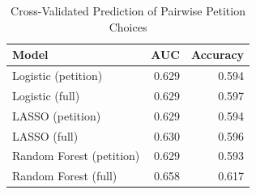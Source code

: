 \begin{table}[ht]
\centering
\begin{tabular}{lrr}
  \toprule
Model & AUC & Accuracy \\ 
  \midrule
Logistic (petition) & 0.629 & 0.594 \\ 
  Logistic (full) & 0.629 & 0.597 \\ 
  LASSO (petition) & 0.629 & 0.594 \\ 
  LASSO (full) & 0.630 & 0.596 \\ 
  Random Forest (petition) & 0.629 & 0.593 \\ 
  Random Forest (full) & 0.658 & 0.617 \\ 
   \bottomrule
\end{tabular}
\caption{Cross-Validated Prediction of Pairwise Petition Choices} 
\label{tab:prediction_cv}
\end{table}
